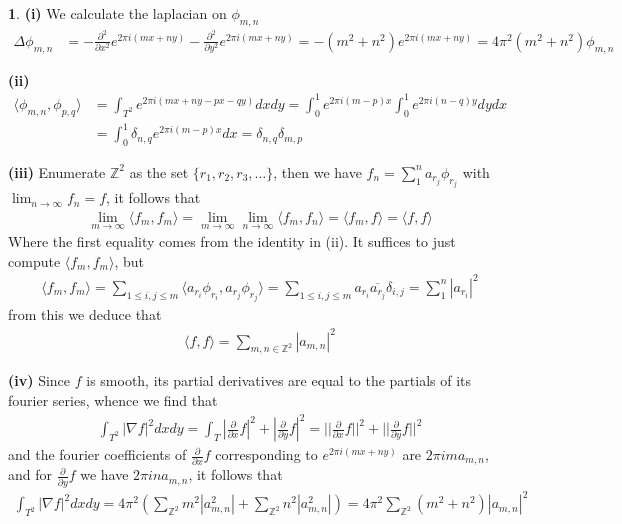 \documentclass[10.5pt]{article}
\theoremstyle{definition}
\newtheorem{pb}{}
\newcommand{\set}[1]{\{#1\}}
\newcommand{\gen}[1]{\langle#1\rangle}
\newcommand{\abs}[1]{\left\vert#1\right\vert}
\newcommand{\norm}[1]{\lvert\lvert#1\rvert\rvert}
\newcommand{\px}{\frac{\partial}{\partial x}}
\newcommand{\py}{\frac{\partial}{\partial y}}
\newcommand{\pxpx}{\frac{\partial^2}{\partial x^2}}
\newcommand{\pypy}{\frac{\partial^2}{\partial y^2}}
\begin{document}
    \begin{pb}
        \textbf{(i)} We calculate the laplacian on \(\phi_{m,n}\)
        \begin{align}
            \Delta \phi_{m,n} &= -\pxpx e^{2\pi i (mx + ny)} -\pypy e^{2\pi i (mx + ny)} = -(m^2 + n^2)e^{2\pi i (mx + ny)} = 4\pi^2(m^2 + n^2)\phi_{m,n}
        \end{align}

        \textbf{(ii)}
        \begin{align}
            \gen{\phi_{m,n},\phi_{p,q}} &= \int_{T^2}e^{2\pi i (mx + ny - px - qy)}dxdy = \int_0^1 e^{2\pi i(m - p)x}\int_0^1 e^{2\pi i(n - q)y}dydx \\
            &= \int_0^1 \delta_{n,q} e^{2\pi i(m - p)x} dx = \delta_{n,q}\delta_{m,p}
        \end{align}

        \textbf{(iii)} Enumerate \(\mathbb{Z}^2\) as the set \(\set{r_1,r_2,r_3,\hdots}\), then we have \(f_n = \sum_1^n a_{r_j} \phi_{r_j} \) with \(\lim_{n\to\infty} f_n = f\), it follows that
        \begin{align}
            \lim_{m\to\infty}\gen{f_m,f_m} = \lim_{m\to\infty}\lim_{n\to\infty}\gen{f_m,f_n} = \gen{f_m,f} = \gen{f,f}
        \end{align}
        Where the first equality comes from the identity in (ii). It suffices to just compute \(\gen{f_m,f_m}\), but 
        \begin{align}
            \gen{f_m,f_m} = \sum_{1\leq i,j \leq m} \gen{a_{r_i}\phi_{r_i},a_{r_j}\phi_{r_j}} = \sum_{1\leq i,j \leq m} a_{r_i}\overline{a_{r_j}}\delta_{i,j} = \sum_1^n \abs{a_{r_i}}^2
        \end{align}
        from this we deduce that
        \begin{align}
            \gen{f,f} = \sum_{m,n\in \mathbb{Z}^2}\abs{a_{m,n}}^2
        \end{align}

        \textbf{(iv)} Since \(f\) is smooth, its partial derivatives are equal to the partials of its fourier series, whence we find that
        \begin{align}
            \int_{T^2}\abs{\nabla f}^2dxdy = \int_T \abs{\px f}^2 + \abs{\py f}^2 = \norm{\px f}^2 + \norm{\py f}^2
        \end{align}
        and the fourier coefficients of \(\px f\) corresponding to \(e^{2\pi i(mx + ny)}\) are \(2\pi i m a_{m,n}\), and for \(\py f\) we have \(2\pi i n a_{m,n}\), it follows that
        \begin{align}
            \int_{T^2}\abs{\nabla f}^2dxdy = 4\pi^2\left(\sum_{\mathbb{Z}^2} m^2\abs{a_{m,n}^2}  + \sum_{\mathbb{Z}^2}n^2\abs{a^2_{m,n}}\right) = 4\pi^2 \sum_{\mathbb{Z}^2} (m^2 + n^2)\abs{a_{m,n}}^2
        \end{align}


\end{pb}
\end{document}
